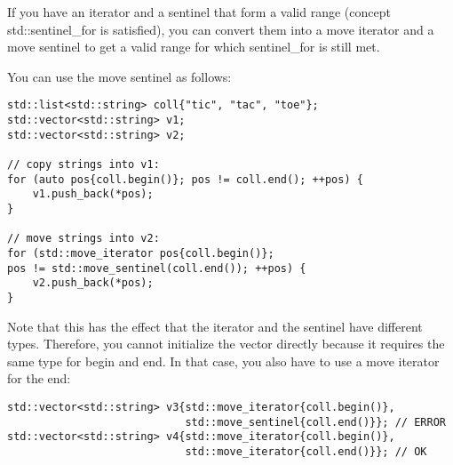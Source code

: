 If you have an iterator and a sentinel that form a valid range (concept std::sentinel\_for is satisfied), you can convert them into a move iterator and a move sentinel to get a valid range for which sentinel\_for is still met.

You can use the move sentinel as follows:

\begin{lstlisting}[style=styleCXX]
std::list<std::string> coll{"tic", "tac", "toe"};
std::vector<std::string> v1;
std::vector<std::string> v2;

// copy strings into v1:
for (auto pos{coll.begin()}; pos != coll.end(); ++pos) {
	v1.push_back(*pos);
}

// move strings into v2:
for (std::move_iterator pos{coll.begin()};
pos != std::move_sentinel(coll.end()); ++pos) {
	v2.push_back(*pos);
}
\end{lstlisting}

Note that this has the effect that the iterator and the sentinel have different types. Therefore, you cannot initialize the vector directly because it requires the same type for begin and end. In that case, you also have to use a move iterator for the end:

\begin{lstlisting}[style=styleCXX]
std::vector<std::string> v3{std::move_iterator{coll.begin()},
							std::move_sentinel{coll.end()}}; // ERROR
std::vector<std::string> v4{std::move_iterator{coll.begin()},
							std::move_iterator{coll.end()}}; // OK
\end{lstlisting}















